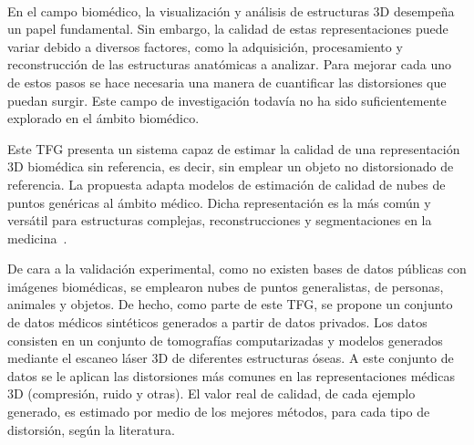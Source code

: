 \chapter*{}


% 


\thispagestyle{empty}

\begin{center}
{\large\bfseries \myTitle}\\
\end{center}
\begin{center}
\myName\\
\end{center}

\\

\\
En el campo biomédico, la visualización y análisis de estructuras 3D
desempeña un papel fundamental. 
Sin embargo, la calidad de estas representaciones puede variar debido a diversos 
factores, como la adquisición, procesamiento y reconstrucción de las estructuras anatómicas a analizar. 
Para mejorar cada uno de estos pasos se hace necesaria una manera de cuantificar las distorsiones que puedan surgir. 
Este campo de investigación todavía no ha sido suficientemente explorado en el ámbito biomédico.
\smallskip

Este TFG presenta un sistema capaz de estimar la calidad de 
una representación 3D biomédica sin referencia, es decir, sin emplear un objeto 
no distorsionado de referencia. La propuesta 
adapta modelos de estimación de calidad de nubes de puntos genéricas 
al ámbito médico. Dicha representación es la más común y versátil para 
estructuras complejas, reconstrucciones y segmentaciones en la medicina~\cite{WhyUsePointCloud}. 
\smallskip

De cara a la validación experimental, como no existen bases de datos públicas con imágenes 
biomédicas, se emplearon nubes de puntos generalistas, de personas, animales y objetos. 
De hecho, como parte de este TFG, se propone un conjunto de datos médicos sintéticos 
generados a partir de datos privados. 
Los datos consisten en un conjunto de tomografías computarizadas y modelos 
generados mediante el escaneo láser 3D de diferentes estructuras óseas. 
A este conjunto de datos se le aplican las distorsiones más comunes 
en las representaciones médicas 3D (compresión, ruido y otras). 
El valor real de calidad, de cada ejemplo generado, es estimado por medio de 
los mejores métodos, para cada tipo de distorsión, según la literatura. 
\smallskip

